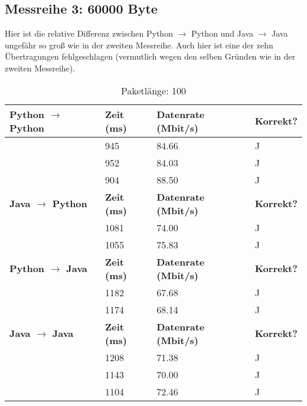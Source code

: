 \documentclass{article}
\begin{document}
    \subsection{Messreihe 3: 60000 Byte}\label{subsec:messreihe-2:-60000-byte}
    Hier ist die relative Differenz zwischen Python $\rightarrow$ Python und Java $\rightarrow$ Java ungefähr so groß wie in der zweiten Messreihe.
    Auch hier ist eine der zehn Übertragungen fehlgeschlagen (vermutlich wegen den selben Gründen wie in der zweiten Messreihe).

    \begin{table}[]
        \caption{Paketlänge: 100}
        \label{tab:my-tablev1_100}
        \begin{tabular}{|l|l|l|l|}
            \hline
            \textbf{Python $\rightarrow$ Python} & \textbf{Zeit (ms)} & \textbf{Datenrate (Mbit/s)} & \textbf{Korrekt?} \\ \hline
            & 945       & 84.66              & J        \\ \cline{2-4}
            & 952       & 84.03              & J        \\ \cline{2-4}
            & 904       & 88.50              & J        \\ \hline
            \textbf{Java $\rightarrow$ Python}   & \textbf{Zeit (ms)} & \textbf{Datenrate (Mbit/s)} & \textbf{Korrekt?} \\ \hline
            & 1081      & 74.00              & J        \\ \cline{2-4}
            & 1055      & 75.83              & J        \\ \hline
            \textbf{Python $\rightarrow$ Java}  & \textbf{Zeit (ms)} & \textbf{Datenrate (Mbit/s)} & \textbf{Korrekt?} \\ \hline
            & 1182      & 67.68              & J        \\ \cline{2-4}
            & 1174      & 68.14              & J        \\ \hline
            \textbf{Java $\rightarrow$ Java}   & \textbf{Zeit (ms)} & \textbf{Datenrate (Mbit/s)} & \textbf{Korrekt?} \\ \hline
            & 1208      & 71.38              & J        \\ \cline{2-4}
            & 1143      & 70.00              & J        \\ \cline{2-4}
            & 1104      & 72.46              & J        \\ \hline
        \end{tabular}
    \end{table}
\end{document}
